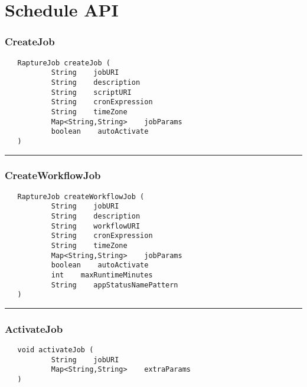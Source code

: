\chapter{Schedule API}

\subsection{CreateJob}
\label{Api:CreateJob}
\begin{verbatim}
   RaptureJob createJob (
           String    jobURI
           String    description
           String    scriptURI
           String    cronExpression
           String    timeZone
           Map<String,String>    jobParams
           boolean    autoActivate
   )
\end{verbatim}



\rule{15cm}{2pt}
\subsection{CreateWorkflowJob}
\label{Api:CreateWorkflowJob}
\begin{verbatim}
   RaptureJob createWorkflowJob (
           String    jobURI
           String    description
           String    workflowURI
           String    cronExpression
           String    timeZone
           Map<String,String>    jobParams
           boolean    autoActivate
           int    maxRuntimeMinutes
           String    appStatusNamePattern
   )
\end{verbatim}



\rule{15cm}{2pt}
\subsection{ActivateJob}
\label{Api:ActivateJob}
\begin{verbatim}
   void activateJob (
           String    jobURI
           Map<String,String>    extraParams
   )
\end{verbatim}



